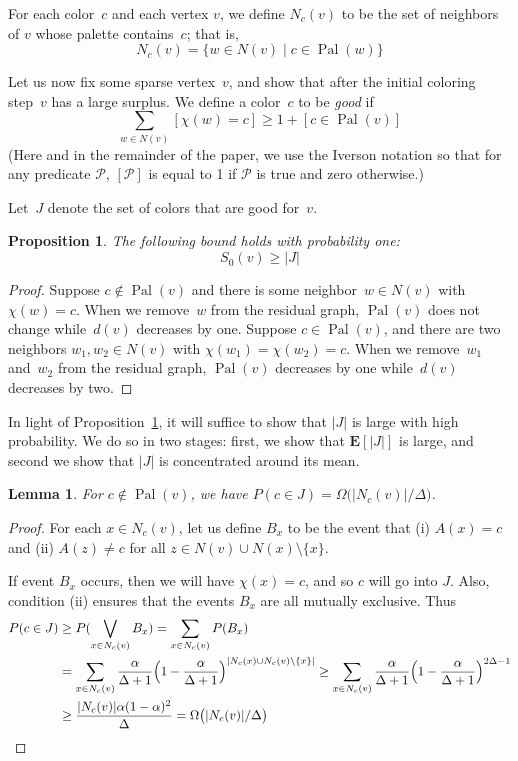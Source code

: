 \documentclass[11pt]{amsart}
\newtheorem{proposition}[theorem]{Proposition}
\newtheorem{lemma}[theorem]{Lemma}
\newcommand{\bE}{\ensuremath{\mathbf{E}}}
\newcommand{\pal}{\operatorname{Pal}}
\begin{document}
For each color~$c$ and each vertex $v$, we define $N_c(v)$ to be the set of neighbors of $v$ whose palette contains~$c$; that is, $$
N_c(v) = \{w \in N(v) \mid c \in \pal(w) \}
$$

Let us now fix some sparse vertex~$v$, and show that after the initial coloring step~$v$ has a large surplus. We define a color~$c$ to be \emph{good} if
$$
\sum_{w \in N(v)} [\chi(w) = c] \geq 1 + [c \in \pal(v)]
$$
(Here and in the remainder of the paper, we use the Iverson notation so that for any predicate $\mathcal P$,  $[ \mathcal P ]$ is equal to 1 if $\mathcal P$ is true and zero otherwise.)

Let~$J$ denote the set of colors that are good for~$v$. 
\begin{proposition}
\label{sparse-prop2}
The following bound holds with probability one:
$$
S_0(v) \geq |J|
$$
\end{proposition}
\begin{proof}
Suppose $c \notin \pal(v)$ and there is some neighbor~$w \in N(v)$ with~$\chi(w) = c$. When we remove~$w$ from the residual graph, $\pal(v)$ does not change while~$d(v)$ decreases by one. Suppose $c \in \pal(v)$, and there are two neighbors $w_1, w_2 \in N(v)$ with $\chi(w_1) = \chi(w_2) = c$. When we remove~$w_1$ and~$w_2$ from the residual graph, $\pal(v)$ decreases by one while~$d(v)$ decreases by two.
\end{proof}

In light of Proposition~\ref{sparse-prop2}, it will suffice to show that $|J|$ is large with high probability. We do so in two stages: first, we show that $\bE[ |J| ]$ is large, and second we show that $|J|$ is concentrated around its mean.
\begin{lemma} \label{sparse-prop3a}
For $c \notin \pal(v)$, we have $P(c \in J) = \Omega \bigl( |N_c(v)|/\Delta \bigr)$.
\end{lemma}
\begin{proof}
For each $x \in N_c(v)$, let us define $B_x$ to be the event that (i) $A(x) = c$ and (ii) $A(z) \neq c$ for all $z \in N(v) \cup N(x) \setminus \{x \}$. 

If event $B_x$ occurs, then we will have $\chi(x) = c$, and so $c$ will go into $J$. Also, condition (ii) ensures that the events $B_x$ are all mutually exclusive. Thus
\begin{align*}
P(c \in J) &\geq P( \bigvee_{x \in N_c(v)} B_x ) = \sum_{x \in N_c(v)} P(B_x)  \\
&= \sum_{x \in N_c(v)} \frac{\alpha}{\Delta+1} \Bigl( 1 - \frac{\alpha}{\Delta+1} \Bigr)^{|N_c(x) \cup N_c(v) \setminus \{ x \} |} \geq \sum_{x \in N_c(v)} \frac{\alpha}{\Delta+1} \Bigl( 1 - \frac{\alpha}{\Delta+1} \Bigr)^{2 \Delta - 1} \\
&\geq \frac{|N_c(v)| \alpha (1 - \alpha)^2}{\Delta} = \Omega\bigl( |N_c(v)| / \Delta \bigr) 
\end{align*}
\end{proof}
\end{document}
